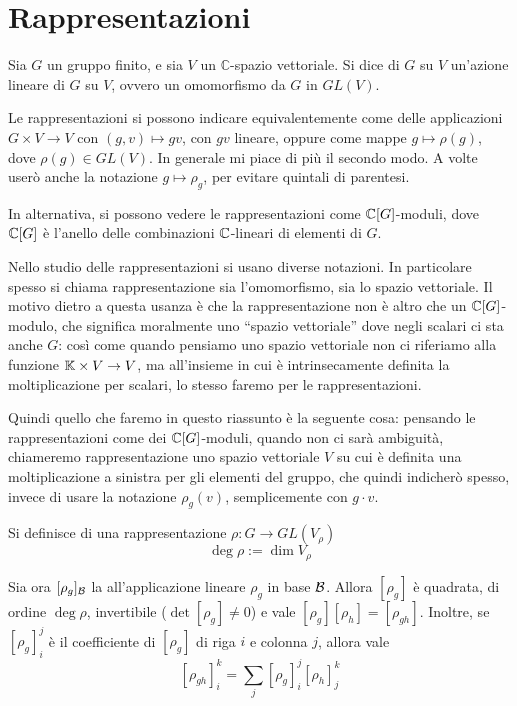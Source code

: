 \section{Rappresentazioni}
	\begin{mydef}
		Sia $G$ un gruppo finito, e sia $V$ un $\mathbb C$-spazio vettoriale. Si dice  di $G$ su $V$ un'azione lineare di $G$ su $V$, ovvero un omomorfismo da $G$ in $GL(V)$.
	\end{mydef}

	Le rappresentazioni si possono indicare equivalentemente come delle applicazioni $G \times V \rightarrow V$ con $(g,v)\mapsto gv$, con $gv$ lineare, oppure come mappe $g \mapsto \rho(g)$, dove $\rho(g) \in GL(V)$. In generale mi piace di più il secondo modo. A volte userò anche la notazione $g \mapsto \rho_g$, per evitare quintali di parentesi.

	In alternativa, si possono vedere le rappresentazioni come $\mathbb C[G]$-moduli, dove $\mathbb C[G]$ è l'anello delle combinazioni $\mathbb C$-lineari di elementi di $G$.

	\begin{myobs}
		Nello studio delle rappresentazioni si usano diverse notazioni. In particolare spesso si chiama rappresentazione sia l'omomorfismo, sia lo spazio vettoriale. Il motivo dietro a questa usanza è che la rappresentazione non è altro che un $\mathbb C[G]$-modulo, che significa moralmente uno ``spazio vettoriale'' dove negli scalari ci sta anche $G$: così come quando pensiamo uno spazio vettoriale non ci riferiamo alla funzione $\mathbb K \times V \rightarrow V$, ma all'insieme in cui è intrinsecamente definita la moltiplicazione per scalari, lo stesso faremo per le rappresentazioni.
		
		Quindi quello che faremo in questo riassunto è la seguente cosa: pensando le rappresentazioni come dei $\mathbb C[G]$-moduli, quando non ci sarà ambiguità, chiameremo rappresentazione uno spazio vettoriale $V$ su cui è definita una moltiplicazione a sinistra per gli elementi del gruppo, che quindi indicherò spesso, invece di usare la notazione $\rho_g(v)$, semplicemente con $g\cdot v$. 
	\end{myobs}

	\begin{mydef}
		Si definisce  di una rappresentazione $\rho:G \rightarrow GL(V_\rho)$
		\[\deg \rho := \dim V_\rho\]
	\end{mydef}


	Sia ora $[\rho_g]_\mathcal B$ la  all'applicazione lineare $\rho_g$ in base $\mathcal B$. Allora $[\rho_g]$ è quadrata, di ordine $\deg \rho$, invertibile ($\det [\rho_g]\ne 0$) e vale $[\rho_g] [\rho_h]=[\rho_{gh}]$. Inoltre, se $[\rho_g]_i^j$ è il coefficiente di $[\rho_g]$ di riga $i$ e colonna $j$, allora vale
	\[
		[\rho_{gh}]_i^k=\sum_j [\rho_g]_i^j [\rho_h]_j^k
	\]

